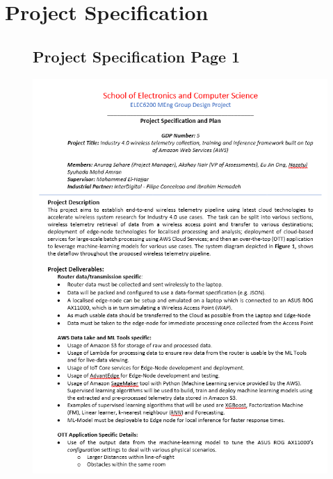 \chapter{Project Specification}
\label{appendix:project_specification}


\begin{figure}
\begin{minipage}{\linewidth}
\section{Project Specification Page 1}
    \centering
    \includegraphics[width=1\linewidth]{images/Specification/pg_1.png}
    \label{appendix:specification_page_1}
\end{minipage}
\end{figure}

